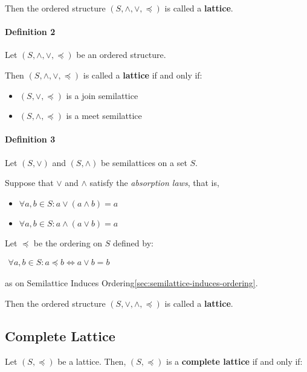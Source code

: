 Then the ordered structure $(S, \wedge, \vee, \preceq)$ is called a
\textbf{lattice}.

\paragraph{Definition 2}

Let $(S, \wedge, \vee, \preceq)$ be an ordered structure.

Then $(S, \wedge, \vee, \preceq)$ is called a \textbf{lattice} if and
only if:

\begin{itemize}
\item $(S,\vee, \preceq)$ is a join semilattice
\item $(S,\wedge, \preceq)$ is a meet semilattice
\end{itemize}

\paragraph{Definition 3}

Let $(S, \vee)$ and $(S, \wedge)$ be semilattices on a set $S$.

Suppose that $\vee$ and $\wedge$ satisfy the \textit{absorption laws}, that is,

\begin{itemize}
\item $\forall a, b \in S: a \vee (a \wedge b) = a$
\item $\forall a, b \in S: a \wedge (a \vee b) = a$
\end{itemize}

Let $\preceq$ be the ordering on $S$ defined by:

\begin{math}
  \begin{array}{c}
    \forall a, b \in S: a \preceq b \iff a \vee b = b
  \end{array}
\end{math}

as on Semilattice Induces
Ordering\ref{sec:semilattice-induces-ordering}.

Then the ordered structure $(S, \vee, \wedge, \preceq)$ is called a
\textbf{lattice}.


\subsection{Complete Lattice}
\label{sec:complete-lattice}

Let $(S, \preceq)$ be a lattice. Then, $(S, \preceq)$ is a
\textbf{complete lattice} if and only if:

